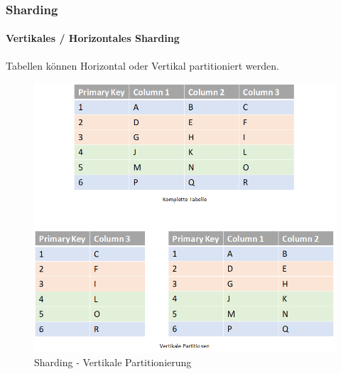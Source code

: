 
\begin{flushleft}
    \subsubsection{Sharding}
    \paragraph{Vertikales / Horizontales Sharding}
    Tabellen können Horizontal oder Vertikal partitioniert werden.
    \begin{figure}[H]
        \centering
        \includegraphics[width=0.8\linewidth]{source/implementation/evaluation/excursus_architecture/sharding_vertical_partitioning}
        \caption{Sharding - Vertikale Partitionierung}
        \label{fig:sharding_vertical_partitioning}
    \end{figure}
    \begin{figure}[H]
        \centering

\end{figure}
\end{flushleft}
